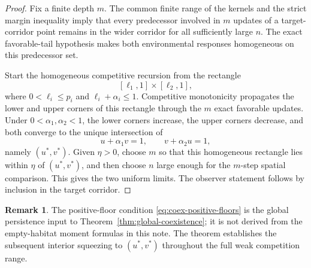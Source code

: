 \documentclass[11pt]{article}
\theoremstyle{definition}
\newtheorem{remark}[theorem]{Remark}
\begin{document}
\begin{proof}
Fix a finite depth \(m\).  The common finite range of the kernels and the
strict margin inequality imply that every predecessor involved in \(m\)
updates of a target-corridor point remains in the wider corridor for all
sufficiently large \(n\).  The exact favorable-tail hypothesis makes both
environmental responses homogeneous on this predecessor set.

Start the homogeneous competitive recursion from the rectangle
\[
  [\ell_1,1]\times[\ell_2,1],
\]
where \(0<\ell_i\leq p_i\) and
\(\ell_i+\alpha_i\leq1\).  Competitive monotonicity propagates the lower and
upper corners of this rectangle through the \(m\) exact favorable updates.
Under \(0<\alpha_1,\alpha_2<1\), the lower corners increase, the upper
corners decrease, and both converge to the unique intersection of
\[
  u+\alpha_1v=1,
  \qquad
  v+\alpha_2u=1,
\]
namely \((u^*,v^*)\).  Given \(\eta>0\), choose \(m\) so that this homogeneous
rectangle lies within \(\eta\) of \((u^*,v^*)\), and then choose \(n\) large
enough for the \(m\)-step spatial comparison.  This gives the two uniform
limits.  The observer statement follows by inclusion in the target corridor.
\end{proof}

\begin{remark}
The positive-floor condition \eqref{eq:coex-positive-floors} is the global
persistence input to Theorem~\ref{thm:global-coexistence}; it is not derived
from the empty-habitat moment formulas in this note.  The theorem establishes
the subsequent interior squeezing to \((u^*,v^*)\) throughout the full weak
competition range.
\end{remark}
\end{document}
